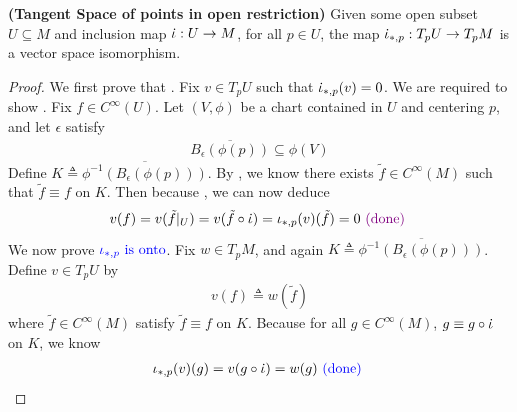 \documentclass{report}
\begin{document}
\begin{theorem}
\label{TSop}
\textbf{(Tangent Space of points in open restriction)} Given some open subset $U \subseteq M$ and inclusion map $\dot{\iota}  :U\rightarrow M $, for all $p \in U$, the map $\dot{\iota} _{*,p}:T_pU\rightarrow T_pM$ is a vector space isomorphism.  
\end{theorem}
\begin{proof}
  We first prove that . Fix $v \in T_pU$ such that $\dot{\iota}_{*,p}(v)=0$.  We are required to show . Fix $f\in C^{\infty}(U)$. Let $(V,\phi)$ be a chart contained in $U$ and centering $p$, and let  $\epsilon $ satisfy 
\begin{align*}
  \overline{B_\epsilon (\phi (p))}\subseteq \phi (V)  
\end{align*}
Define  $K\triangleq  \overline{\phi ^{-1}(B_\epsilon (\phi (p)))}$. By , we know there exists $\tilde{f}\in C^{\infty}(M)$ such that $\tilde{f}\equiv f$ on $K$. Then because , we can now deduce 
  \begin{align*}
  v(f)=v(\tilde{f}|_U )=v(\tilde{f}\circ \dot{\iota}   )=\iota_{*,p}(v)(\tilde{f}) =0 \textcolor{violet}{\text{ (done) }}
  \end{align*}
  We now prove $\textcolor{blue}{\iota_{*,p}\text{ is onto}}$. Fix $w\in T_pM$, and again  $K\triangleq \overline{\phi^{-1}(B_\epsilon (\phi (p)))}$. Define $v\in T_pU$ by 
\begin{align*}
v(f)\triangleq w(\tilde{f})
\end{align*}
where $\tilde{f}\in C^{\infty}(M)$ satisfy $\tilde{f}\equiv f$ on $K$. Because for all $g\in C^{\infty}(M)$, $g \equiv g \circ \dot{\iota}  $ on $K$, we know 
\begin{align*}
\iota_{*,p}(v)(g)=v(g\circ \dot{\iota} )= w(g) \textcolor{blue}{\text{ (done) }}
\end{align*}
\end{proof}
\end{document}
